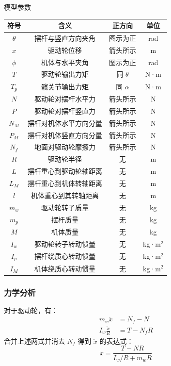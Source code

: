 \documentclass{beamer}
\begin{document}
	\begin{frame}{模型参数}
		\scriptsize %
		\centering
		\begin{tabular}{cccc}
			\toprule
			\textbf{符号} & \textbf{含义} & \textbf{正方向} & \textbf{单位} \\
			\midrule
			$\theta$  & 摆杆与竖直方向夹角         & 图示为正   & rad \\
			$x$       & 驱动轮位移                 & 箭头所示   & m \\
			$\phi$    & 机体与水平夹角             & 图示为正   & rad \\
			$T$       & 驱动轮输出力矩             & 同 $\theta$ & N·m \\
			$T_p$     & 髋关节输出力矩             & 同 $\alpha$ & N·m \\
			$N$       & 驱动轮对摆杆水平力         & 箭头所示   & N \\
			$P$       & 驱动轮对摆杆竖直力         & 箭头所示   & N \\
			$N_M$     & 摆杆对机体水平方向分量     & 箭头所示   & N \\
			$P_M$     & 摆杆对机体竖直方向分量     & 箭头所示   & N \\
			$N_f$     & 地面对驱动轮摩擦力         & 箭头所示   & N \\
			$R$       & 驱动轮半径                 & 无         & m \\
			$L$       & 摆杆重心到驱动轮轴距离     & 无         & m \\
			$L_M$     & 摆杆重心到机体转轴距离     & 无         & m \\
			$l$       & 机体重心到其转轴距离       & 无         & m \\
			$m_w$     & 驱动轮转子质量             & 无         & kg \\
			$m_p$     & 摆杆质量                   & 无         & kg \\
			$M$       & 机体质量                   & 无         & kg \\
			$I_w$     & 驱动轮转子转动惯量         & 无         & kg·m$^2$ \\
			$I_p$     & 摆杆绕质心转动惯量         & 无         & kg·m$^2$ \\
			$I_M$     & 机体绕质心转动惯量         & 无         & kg·m$^2$ \\
			\bottomrule
		\end{tabular}
	\end{frame}
	
	
	
	\begin{frame}
		\frametitle{力学分析}
		对于驱动轮，有：
		\begin{align*}
			m_w \ddot{x} &= N_f - N \tag{3-1} \\
			I_w \frac{\ddot{x}}{R} &= T - N_f R \tag{3-2}
		\end{align*}
		合并上述两式并消去 $N_f$ 得到 $\ddot{x}$ 的表达式：
		\begin{equation*}
			\ddot{x} = \frac{T - N R}{I_w / R + m_w R} \tag{3-3}
		\end{equation*}
	\end{frame}
	
\end{document}

